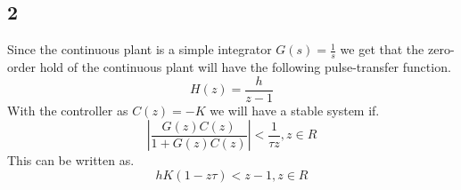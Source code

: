 \documentclass[10pt,a4paper]{article}
\begin{document}
\subsection*{2}
Since the continuous plant is a simple integrator $G(s)=\frac{1}{s}$ we get that the zero-order hold of the continuous plant will have the following pulse-transfer function.
\begin{equation*}
H(z)=\frac{h}{z-1}
\end{equation*}
With the controller as $C(z)=-K$ we will have a stable system if.
\begin{equation*}
|\frac{G(z)C(z)}{1+G(z)C(z)}|<\frac{1}{\tau z},	z\in R
\end{equation*}
This can be written as.
\begin{equation*}
hK(1-z\tau)<z-1,	z\in R
\end{equation*}
\end{document}

